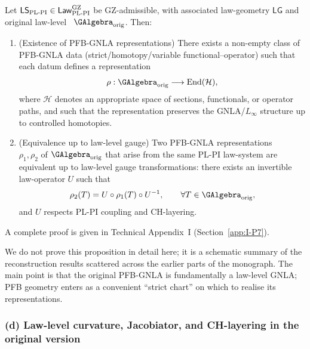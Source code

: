 \documentclass[11pt]{book}
\theoremstyle{plain}
\theoremstyle{definition}
\begin{document}
\begin{proposition}
Let
  $\mathsf{LS}_{\mathrm{PL\text- PI}}
   \in\mathsf{Law}_{\mathrm{PL\text- PI}}^{\mathrm{GZ}}$
  be GZ-admissible, with associated law-geometry $\mathsf{LG}$ and
  original law-level \GAlgebra\ $\GAlgebra_{\mathrm{orig}}$.
  Then:
  \begin{enumerate}[label=\roman*)]
    \item (Existence of PFB-GNLA representations)
          There exists a non-empty class of PFB-GNLA data
          (strict/homotopy/variable functional--operator) such that
          each datum defines a representation
          \[
             \rho:
               \GAlgebra_{\mathrm{orig}}
               \longrightarrow
               \mathrm{End}(\mathcal{H}),
          \]
          where $\mathcal{H}$ denotes an appropriate space of
          sections, functionals, or operator paths, and such that the
          representation preserves the GNLA/$L_\infty$ structure up to
          controlled homotopies.
    \item (Equivalence up to law-level gauge)
          Two PFB-GNLA representations \\ $\rho_1,\rho_2$ of
          $\GAlgebra_{\mathrm{orig}}$ that arise from the same PL-PI
          law-system are equivalent up to law-level gauge
          transformations: there exists an invertible law-operator
          $U$ such that
          \[
             \rho_2(T)
             =
             U\circ\rho_1(T)\circ U^{-1},
             \qquad
             \forall T\in \GAlgebra_{\mathrm{orig}},
          \]
          and $U$ respects PL-PI coupling and CH-layering.
  \end{enumerate}
  A complete proof is given in Technical Appendix~I
  (Section~\ref{app:I-P7}).
\end{proposition}

We do not prove this proposition in detail here; it is a schematic
summary of the reconstruction results scattered across the earlier
parts of the monograph. The main point is that the original PFB-GNLA
is fundamentally a law-level GNLA; PFB geometry enters as a convenient
“strict chart” on which to realise its representations.



\subsubsection*{(d) Law-level curvature, Jacobiator, and CH-layering in the original version}
\end{document}
